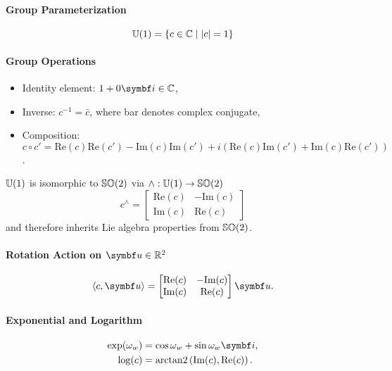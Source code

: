 \begin{properties}[breakable, title={$\Uone$ as a parameterization of $\SOtwo$}]
  \paragraph{Group Parameterization}
  \begin{equation}
    {\mathbb{U}(1)} = \left\{ c \in \mathbb{C} \mid |c| = 1 \right\}
  \end{equation}
  \paragraph{Group Operations}
  \begin{itemize}
    \item Identity element: $1 + 0 \bi \in \mathbb{C}$,
    \item Inverse: $c^{-1} = \bar c$, where bar denotes complex conjugate,
    \item Composition: $c \circ c' = \textrm{Re}(c) \textrm{Re}(c') - \textrm{Im}(c)\textrm{Im}(c') + i \left(\textrm{Re}(c) \textrm{Im}(c') + \textrm{Im}(c) \textrm{Re}(c') \right)$.
  \end{itemize}

  $\Uone$ is isomorphic to $\SOtwo$ via $\wedge: {\mathbb{U}(1)} \rightarrow {\mathbb{SO}(2)}$
  \begin{equation}
    c^{\wedge} = \begin{bmatrix} \textrm{Re}(c) & -\textrm{Im}(c) \\ \textrm{Im}(c) & \textrm{Re}(c) \end{bmatrix}
  \end{equation}
  and therefore inherits Lie algebra properties from $\SOtwo$.

  \paragraph{Rotation Action on $\bu \in \mathbb{R}^{2}$}
  \begin{equation}
    \left\langle c, \bu \right \rangle = \begin{bmatrix} \textrm{Re}(c) & -\textrm{Im}(c) \\ \textrm{Im}(c) & \textrm{Re}(c) \end{bmatrix} \bu.
  \end{equation}

  \paragraph{Exponential and Logarithm}
  \begin{subequations}
    \begin{align}
      \label{eq:u1_exp}
      \exp (\omega_w) & = \cos \omega_{w} + \sin \omega_{w} \bi,                   \\
      \label{eq:u1_log}
      \log (c)        & = \arctantwo\left(\textrm{Im}(c), \textrm{Re}(c)\right).
    \end{align}
  \end{subequations}
\end{properties}

